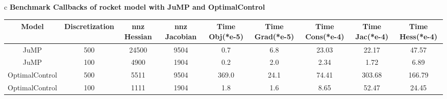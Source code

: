 \documentclass{standalone}
\begin{document}
\begin{tabular}{c}
\Large\textbf{Benchmark Callbacks of rocket model with JuMP and OptimalControl}\\
\begin{tabular}{ccccccccc}
  \hline
  \textbf{Model} & \textbf{Discretization} & \textbf{nnz Hessian} & \textbf{nnz Jacobian} & \textbf{Time Obj(*e-5)} & \textbf{Time Grad(*e-5)} & \textbf{Time Cons(*e-4)} & \textbf{Time Jac(*e-4)} & \textbf{Time Hess(*e-4)} \\\hline
  JuMP & 500 & 24500 & 9504 & 0.7 & 6.8 & 23.03 & 22.17 & 47.57 \\
  JuMP & 100 & 4900 & 1904 & 0.2 & 2.0 & 2.34 & 1.72 & 6.89 \\
  OptimalControl & 500 & 5511 & 9504 & 369.0 & 24.1 & 74.41 & 303.68 & 166.79 \\
  OptimalControl & 100 & 1111 & 1904 & 1.8 & 1.6 & 8.65 & 52.47 & 24.45 \\\hline
\end{tabular}
\end{tabular}
\end{document}
